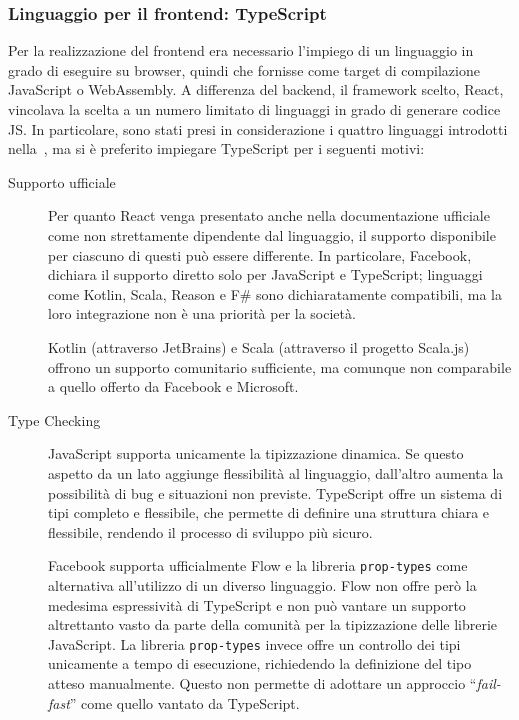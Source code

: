       \subsubsection{Linguaggio per il frontend: TypeScript}
        Per la realizzazione del frontend era necessario l'impiego di un linguaggio in grado di eseguire su browser, quindi che fornisse come target di compilazione JavaScript o WebAssembly.
        A differenza del backend, il framework scelto, React, vincolava la scelta a un numero limitato di linguaggi in grado di generare codice JS\@.
        In particolare, sono stati presi in considerazione i quattro linguaggi introdotti nella~, ma si è preferito impiegare TypeScript per i seguenti motivi:

        \begin{description}
          \item[Supporto ufficiale]
            Per quanto React venga presentato anche nella documentazione ufficiale~\cite{react-docs} come non strettamente dipendente dal linguaggio, il supporto disponibile per ciascuno di questi può essere differente.
            In particolare, Facebook, dichiara il supporto diretto solo per JavaScript e TypeScript;
            linguaggi come Kotlin, Scala, Reason e F\# sono dichiaratamente compatibili, ma la loro integrazione non è una priorità per la società.

            Kotlin (attraverso JetBrains) e Scala (attraverso il progetto Scala.js) offrono un supporto comunitario sufficiente, ma comunque non comparabile a quello offerto da Facebook e Microsoft.

          \item[Type Checking]
            JavaScript supporta unicamente la tipizzazione dinamica.
            Se questo aspetto da un lato aggiunge flessibilità al linguaggio, dall'altro aumenta la possibilità di bug e situazioni non previste.
            TypeScript offre un sistema di tipi completo e flessibile, che permette di definire una struttura chiara e flessibile, rendendo il processo di sviluppo più sicuro.

            Facebook supporta ufficialmente Flow e la libreria \texttt{prop-types} come alternativa all'utilizzo di un diverso linguaggio.
            Flow non offre però la medesima espressività di TypeScript e non può vantare un supporto altrettanto vasto da parte della comunità per la tipizzazione delle librerie JavaScript.
            La libreria \texttt{prop-types} invece offre un controllo dei tipi unicamente a tempo di esecuzione, richiedendo la definizione del tipo atteso manualmente.
            Questo non permette di adottare un approccio ``\emph{fail-fast}'' come quello vantato da TypeScript.


\end{description}
